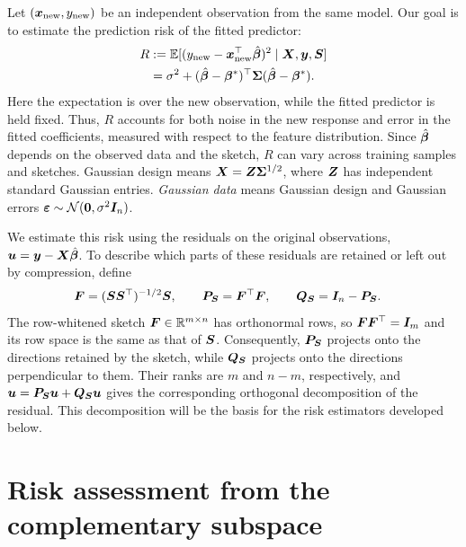 \documentclass{article}
\theoremstyle{plain} %
\theoremstyle{definition} %
\theoremstyle{definition} %
\begin{document}
Let $(\boldsymbol{x}_{\rm new},y_{\rm new})$ be an independent observation from
the same model. Our goal is to estimate the prediction risk of the
fitted predictor:
\begin{align}
 R&:={\mathbb{E}}[(y_{\rm new}-\boldsymbol{x}_{\rm new}^\top\hat{\boldsymbol{\beta}}{})^2
             \mid\boldsymbol{X},\boldsymbol{y},\boldsymbol{S}]\notag\\
  &=\sigma^2+(\hat{\boldsymbol{\beta}}{}-\boldsymbol{\beta}^*)^\top\boldsymbol{\Sigma}(\hat{\boldsymbol{\beta}}{}-\boldsymbol{\beta}^*).
 \label{eq:cpal-prediction-risk}
\end{align}
Here the expectation is over the new observation, while the fitted
predictor is held fixed. Thus, $R$ accounts for both noise in the new
response and error in the fitted coefficients, measured with respect to
the feature distribution. Since $\hat{\boldsymbol{\beta}}{}$ depends on the observed data
and the sketch, $R$ can vary across training samples and sketches.
Gaussian design means $\boldsymbol{X}=\boldsymbol{Z}\boldsymbol{\Sigma}^{1/2}$, where $\boldsymbol{Z}$ has independent
standard Gaussian entries. \emph{Gaussian data} means Gaussian design
and Gaussian errors ${\boldsymbol{\varepsilon} }\sim{\mathcal N}(\mathbf{0},\sigma^2\boldsymbol{I}_n)$.

We estimate this risk using the residuals on the original observations,
$\boldsymbol{u}=\boldsymbol{y}-\boldsymbol{X}\hat{\boldsymbol{\beta}}{}$. To describe which parts of these residuals are
retained or left out by compression, define
\begin{align}
 \boldsymbol{F}&=(\boldsymbol{S}\boldsymbol{S}^\top)^{-1/2}\boldsymbol{S},\qquad
 \boldsymbol{P}_{\boldsymbol{S}}=\boldsymbol{F}^\top\boldsymbol{F},\qquad
 \boldsymbol{Q}_{\boldsymbol{S}}=\boldsymbol{I}_n-\boldsymbol{P}_{\boldsymbol{S}}.
 \label{eq:cpal-observation-geometry}
\end{align}
The row-whitened sketch $\boldsymbol{F}\in{\mathbb{R}}^{m\times n}$ has orthonormal rows, so
$\boldsymbol{F}\boldsymbol{F}^\top=\boldsymbol{I}_m$ and its row space is the same as that of $\boldsymbol{S}$.
Consequently, $\boldsymbol{P}_{\boldsymbol{S}}$ projects onto the directions retained by the
sketch, while $\boldsymbol{Q}_{\boldsymbol{S}}$ projects onto the directions perpendicular to
them. Their ranks are $m$ and $n-m$, respectively, and
$\boldsymbol{u}=\boldsymbol{P}_{\boldsymbol{S}}\boldsymbol{u}+\boldsymbol{Q}_{\boldsymbol{S}}\boldsymbol{u}$ gives the corresponding orthogonal
decomposition of the residual. This decomposition will be the basis for
the risk estimators developed below. 


\section{Risk assessment from the complementary subspace}
\label{sec:cpal-complementary-assessment}
\end{document}
